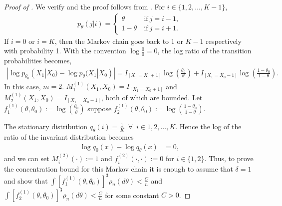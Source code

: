 \documentclass[11pt]{amsart}
\begin{document}
\begin{proof}[Proof of ]

We verify  and the proof follows from . For $i\in \{1,2,\dots,K-1\}$, 
%
\begin{align*}
    p_{\theta}(j|i) = \begin{cases}
    \theta &~\text{if}~j=i-1,\\
    1-\theta&~\text{if}~j=i+1.
    \end{cases}
\end{align*}
%
If $i=0$ or $i=K$, then the Markov chain goes back to $1$ or $K-1$ respectively with probability 1. With the convention $\log\frac{0}{0}=0$, the log ratio of the transition probabilities becomes,
%
\begin{align*}
    | \log p_{\theta_0}(X_1|X_0)-\log p_{\theta}(X_1|X_0) | = I_{[X_1=X_0+1]}\log\left(\frac{\theta_0}{\theta}\right)+I_{[X_1=X_0-1]}\log\left(\frac{1-\theta_0}{1-\theta}\right).
\end{align*}
In this case, $m=2$. $M^{(1)}_1(X_1,X_0)=I_{[X_1=X_0+1]}$ and $M^{(1)}_2(X_1,X_0)=I_{[X_1=X_0-1]}$, both of which are bounded. 
Let $f^{(1)}_1(\theta,\theta_0) := \log\left(\frac{\theta_0}{\theta}\right)$ suppose  $f^{(1)}_2(\theta,\theta_0) :=\log\left(\frac{1-\theta_0}{1-\theta}\right)$. 

The stationary distribution  $q_{\theta}(i)=\frac{1}{K}\enspace\forall\enspace i\in {1,2,\dots,K}$. Hence the log of the ratio of the invariant distribution becomes
\begin{align}
    \log q_{0}(x)-\log q_{\theta}(x) & = 0,
\end{align}
%
and we can set $M^{(2)}_i(\cdot):=1$ and $f^{(2)}_i(\cdot,\cdot):=0$ for $i\in \{1,2\}$. Thus, to prove the concentration bound for this Markov chain it is enough to assume that $\delta=1$ and show that $\int [f^{(1)}_1(\theta,\theta_0)]^3 \rho_n(d\theta)<\frac{C}{n}$ and $\int [f^{(1)}_2(\theta,\theta_0)]^3 \rho_n(d\theta)<\frac{C}{n}$ for some constant $C>0$.


\end{proof}
\end{document}
